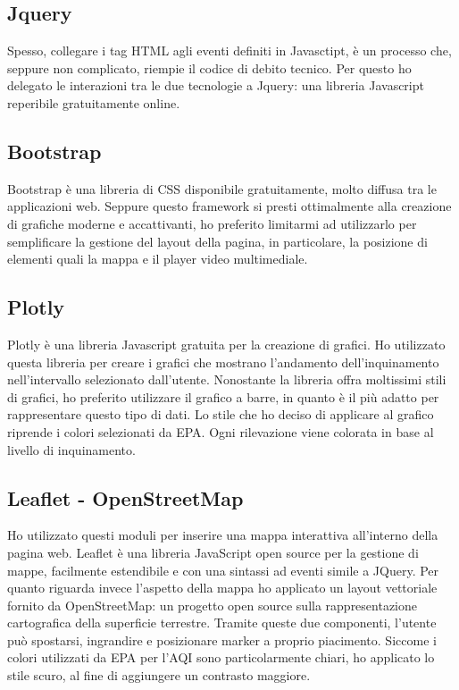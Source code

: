\subsection{Jquery}
Spesso, collegare i tag HTML agli eventi definiti in Javasctipt, è un processo che, seppure non complicato, riempie il codice di debito tecnico.
Per questo ho delegato le interazioni tra le due tecnologie a Jquery: una libreria Javascript reperibile gratuitamente online.

\subsection{Bootstrap}
Bootstrap è una libreria di CSS disponibile gratuitamente, molto diffusa tra le applicazioni web.
Seppure questo framework si presti ottimalmente alla creazione di grafiche moderne e accattivanti, ho preferito limitarmi ad utilizzarlo per semplificare la gestione del layout della pagina, in particolare,
la posizione di elementi quali la mappa e il player video multimediale.

\subsection{Plotly}
Plotly è una libreria Javascript gratuita per la creazione di grafici.
Ho utilizzato questa libreria per creare i grafici che mostrano l'andamento dell'inquinamento nell'intervallo selezionato dall'utente.
Nonostante la libreria offra moltissimi stili di grafici, ho preferito utilizzare il grafico a barre, in quanto è il più adatto per rappresentare questo tipo di dati.
Lo stile che ho deciso di applicare al grafico riprende i colori selezionati da EPA. Ogni rilevazione viene colorata in base al livello di inquinamento.

\subsection{Leaflet - OpenStreetMap}
Ho utilizzato questi moduli per inserire una mappa interattiva all'interno della pagina web.
Leaflet è una libreria JavaScript open source per la gestione di mappe, facilmente estendibile e con una sintassi ad eventi simile a JQuery.
Per quanto riguarda invece l'aspetto della mappa ho applicato un layout vettoriale fornito da OpenStreetMap: un progetto open source sulla rappresentazione cartografica della superficie terrestre.
Tramite queste due componenti, l'utente può spostarsi, ingrandire e posizionare marker a proprio piacimento.
Siccome i colori utilizzati da EPA per l'AQI sono particolarmente chiari, ho applicato lo stile scuro, al fine di aggiungere un contrasto maggiore.

